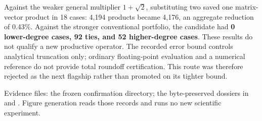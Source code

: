 Against the weaker general multiplier $1+\sqrt2$, substituting two saved one
matrix-vector product in 18 cases: 4,194 products became 4,176,
an aggregate reduction of 0.43\%. Against the stronger conventional
portfolio, the candidate had \textbf{0 lower-degree cases, 92 ties, and 52 higher-degree
cases}. These results do not qualify a new productive operator. The recorded error
bound controls analytical truncation only; ordinary floating-point evaluation and
a numerical reference do not provide total roundoff certification. This route was
therefore rejected as the next flagship rather than promoted on its tighter bound.

{\small\color{muted}Evidence files: the frozen confirmation directory; the
byte-preserved dossiers in  and
. Figure generation reads those records and runs
no new scientific experiment.}
